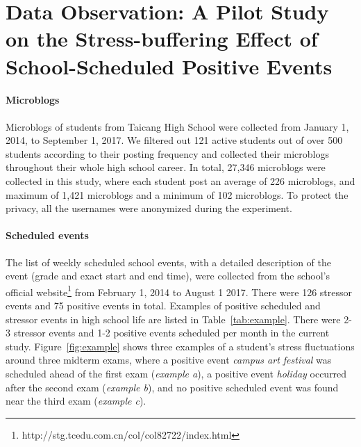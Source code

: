 \section{Data Observation: A Pilot Study on the Stress-buffering Effect of School-Scheduled Positive Events}
\label{sec:obs}
\paragraph{Microblogs} Microblogs of students from Taicang High School were collected from January 1, 2014, to September 1, 2017.
We filtered out 121 active students out of over 500 students according to their posting frequency
and collected their microblogs throughout their whole high school career.
In total, 27,346 microblogs were collected in this study,
where each student post an average of 226 microblogs, and maximum of 1,421 microblogs and a minimum of 102 microblogs.
To protect the privacy, all the usernames were anonymized during the experiment.

\paragraph{Scheduled events} The list of weekly scheduled school events,
with a detailed description of the event (grade and exact start and end time),
were collected from the school's official website\footnote{http://stg.tcedu.com.cn/col/col82722/index.html}
from February 1, 2014 to August 1 2017.
There were 126 stressor events and 75 positive events in total.
Examples of positive scheduled and stressor events in high school life are listed in Table~\ref{tab:example}.
There were 2-3 stressor events and 1-2 positive events scheduled per month in the current study.
Figure~\ref{fig:example} shows three examples of a student's stress fluctuations around three midterm exams,
where a positive event \emph{campus art festival} was scheduled ahead of the first exam (\emph{example a}),
a positive event \emph{holiday} occurred after the second exam (\emph{example b}),
and no positive scheduled event was found near the third exam (\emph{example c}).


\begin{table}[H]
\caption{\small{Examples of school-scheduled positive and stressor events.}}
\label{tab:example}
\end{table}

